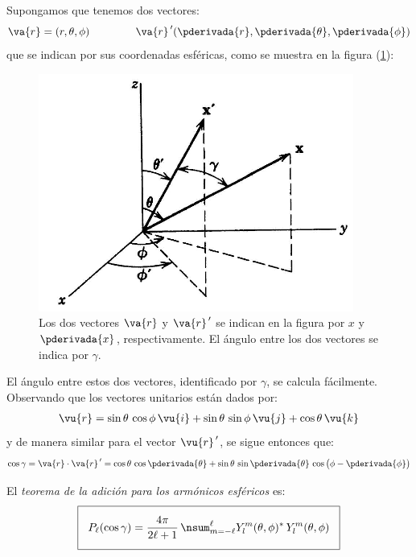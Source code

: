 Supongamos que tenemos dos vectores:
\begin{align}
\va{r} = (r, \theta, \phi) \hspace{1.5cm} \va{r}^{\, \prime} (\pderivada{r}, \pderivada{\theta}, \pderivada{\phi})
\end{align}
que se indican por sus coordenadas esféricas, como se muestra en la figura (\ref{fig:figura_01}):
\begin{figure}[H]
    \centering
    \includegraphics[scale=0.7]{Imagenes/Teorema_Adicion_01.png}
    \caption{Los dos vectores $\va{r}$ y $\va{r}^{\, \prime}$ se indican en la figura por $x$ y $\pderivada{x}$, respectivamente. El ángulo entre los dos vectores se indica por $\gamma$.}
    \label{fig:figura_01}
\end{figure}
El ángulo entre estos dos vectores, identificado por $\gamma$, se calcula fácilmente. Observando que los vectores unitarios están dados por:
\begin{align*}
\vu{r} = \sin \theta \, \cos \phi \, \vu{i} + \sin \theta \, \sin \phi \, \vu{j} + \cos \theta \, \vu{k}
\end{align*}
y de manera similar para el vector $\vu{r}^{\, \prime}$, se sigue entonces que:
\begin{align}
\cos \gamma = \va{r} \cdot \va{r}^{\, \prime} = \cos \theta \, \cos \pderivada{\theta} + \sin \theta \, \sin \pderivada{\theta} \, \cos \big( \phi - \pderivada{\phi} \big)
\label{eq:ecuacion_021}
\end{align}

El \emph{teorema de la adición para los armónicos esféricos} es:
\begin{align*}
\setlength{\fboxsep}{3\fboxsep}\boxed{
P_{\ell} (\cos \gamma) = \dfrac{4 \pi}{2 \ell + 1} \, \nsum_{m=-\ell}^{\ell} Y_{l}^{m} (\theta, \phi)^{*} \, Y_{l}^{m} (\theta, \phi) }
\end{align*}

